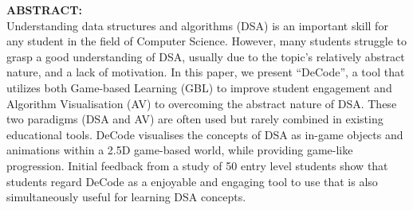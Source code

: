 \documentclass[11pt]{article}
\begin{document}
\noindent \textbf{ABSTRACT:}\\
Understanding data structures and algorithms (DSA) is an important skill for any student in the field of Computer Science. However, many students struggle to grasp a good understanding of DSA, usually due to the topic's relatively abstract nature, and a lack of motivation. In this paper, we present ``DeCode'', a tool that utilizes both Game-based Learning (GBL) to improve student engagement and Algorithm Visualisation (AV) to overcoming the abstract nature of DSA. These two paradigms (DSA and AV) are often used but rarely combined in existing educational tools. DeCode visualises the concepts of DSA as in-game objects and animations within a 2.5D game-based world, while providing game-like progression. Initial feedback from a study of 50 entry level students show that students regard DeCode as a enjoyable and engaging tool to use that is also simultaneously useful for learning DSA concepts.

\listoffigures
\listoftables
\newpage
\end{document}
